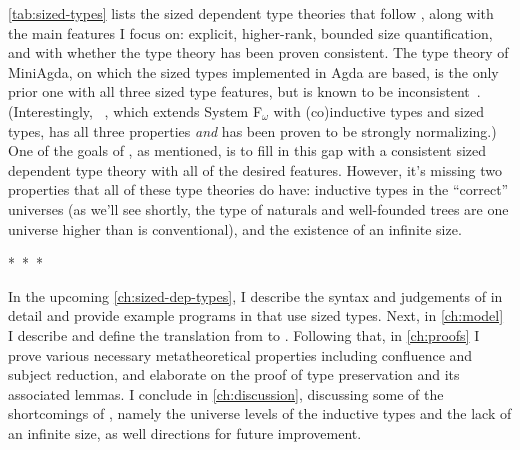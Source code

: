 \cref{tab:sized-types} lists the sized dependent type theories that follow \CIChat,
along with the main features I focus on:
explicit, higher-rank, bounded size quantification,
and with whether the type theory has been proven consistent.
The type theory of MiniAgda, on which the sized types implemented in Agda are based,
is the only prior one with all three sized type features,
but is known to be inconsistent~\citep{infinity}.
(Interestingly, \Fcopomega~\citep{F-omega-cop}, which extends System F$_\omega$ with (co)inductive types and sized types,
has all three properties \emph{and} has been proven to be strongly normalizing.)
One of the goals of \lang, as mentioned, is to fill in this gap
with a consistent sized dependent type theory with all of the desired features.
However, it's missing two properties that all of these type theories do have:
inductive types in the ``correct'' universes
(as we'll see shortly, the type of naturals and well-founded trees
are one universe higher than is conventional),
and the existence of an infinite size.


\begin{center}
\mbox{* * *}
\end{center}
\vspace*{-0.5\baselineskip}

\noindent In the upcoming \cref{ch:sized-dep-types}, I describe the syntax and judgements of \lang in detail
and provide example programs in \lang that use sized types.
Next, in \cref{ch:model} I describe \CICE and define the translation from \lang to \CICE.
Following that, in \cref{ch:proofs} I prove various necessary metatheoretical properties
including confluence and subject reduction,
and elaborate on the proof of type preservation and its associated lemmas.
I conclude in \cref{ch:discussion}, discussing some of the shortcomings of \lang,
namely the universe levels of the inductive types and the lack of an infinite size,
as well directions for future improvement.
